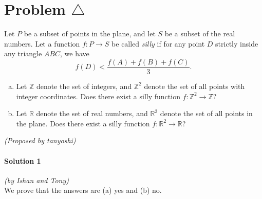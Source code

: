 \documentclass[10pt]{article}
\begin{document}
	\newpage
	
	\section*{Problem \(\triangle\)}

	
	Let \(P\) be a subset of points in the plane, and let \(S\) be a subset of the real numbers. Let a function \(f : P \rightarrow S\) be called \emph{silly} if for any point \(D\) strictly inside any triangle \(ABC\), we have \[f(D) < \frac{f(A) + f(B) + f(C)}{3}.\]
	\begin{enumerate}[(a)]
	\item Let \(\mathbb{Z}\) denote the set of integers, and \(\mathbb{Z}^2\) denote the set of all points with integer coordinates. Does there exist a silly function \(f : \mathbb{Z}^2 \rightarrow \mathbb{Z}\)?
	\item Let \(\mathbb{R}\) denote the set of real numbers, and \(\mathbb{R}^2\) denote the set of all points in the plane. Does there exist a silly function \(f : \mathbb{R}^2 \rightarrow \mathbb{R}\)?
	\end{enumerate}
	\begin{flushright}
	\textit{(Proposed by tanyoshi)}
	\end{flushright}
	
		\noindent \makebox[\linewidth]{\rule{\textwidth}{0.4pt}}	
	
	\paragraph{Solution 1} \textit{(by Ishan and Tony)}\\
	
	\noindent We prove that the answers are (a) yes and (b) no.
	
\end{document}
